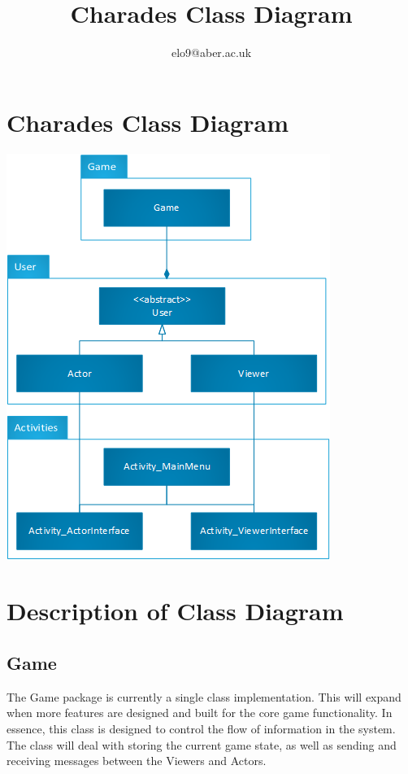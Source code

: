 \documentclass{article}
\title{Charades Class Diagram}
\author{elo9@aber.ac.uk}
\begin{document}
\maketitle
\tableofcontents

\newpage

\section{Charades Class Diagram}
\includegraphics[width=\textwidth]{CharadesClassImage}

\newpage


\section{Description of Class Diagram}
\subsection{Game}
The Game package is currently a single class implementation. This will expand when more features are designed and built for the core game functionality. In essence, this class is designed to control the flow of information in the system. The class will deal with storing the current game state, as well as sending and receiving messages between the Viewers and Actors.
\end{document}
